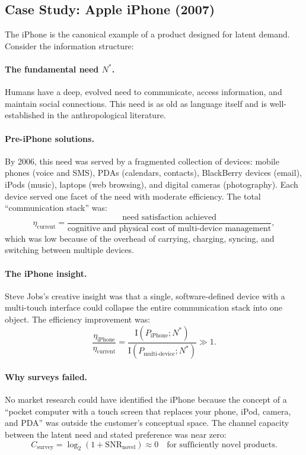 \documentclass[12pt,a4paper,oneside]{book}
\theoremstyle{definition}
\theoremstyle{remark}
\newcommand{\MI}{\mathrm{I}}
\begin{document}
\subsection{Case Study: Apple iPhone (2007)}

The iPhone is the canonical example of a product designed for latent demand. Consider
the information structure:

\paragraph{The fundamental need $N^*$.} Humans have a deep, evolved need to communicate,
access information, and maintain social connections. This need is as old as language
itself and is well-established in the anthropological literature.

\paragraph{Pre-iPhone solutions.} By 2006, this need was served by a fragmented
collection of devices: mobile phones (voice and SMS), PDAs (calendars, contacts),
BlackBerry devices (email), iPods (music), laptops (web browsing), and digital cameras
(photography). Each device served one facet of the need with moderate efficiency. The
total ``communication stack'' was:
\begin{equation}
  \eta_{\text{current}} = \frac{\text{need satisfaction achieved}}
    {\text{cognitive and physical cost of multi-device management}},
\end{equation}
which was low because of the overhead of carrying, charging, syncing, and switching
between multiple devices.

\paragraph{The iPhone insight.} Steve Jobs's creative insight was that a single,
software-defined device with a multi-touch interface could collapse the entire
communication stack into one object. The efficiency improvement was:
\begin{equation}
  \frac{\eta_{\text{iPhone}}}{\eta_{\text{current}}}
  = \frac{\MI(P_{\text{iPhone}}; N^*)}{\MI(P_{\text{multi-device}}; N^*)} \gg 1.
\end{equation}

\paragraph{Why surveys failed.} No market research could have identified the iPhone
because the concept of a ``pocket computer with a touch screen that replaces your phone,
iPod, camera, and PDA'' was outside the customer's conceptual space. The channel capacity
between the latent need and stated preference was near zero:
\begin{equation}
  C_{\text{survey}} = \log_2(1 + \text{SNR}_{\text{novel}}) \approx 0
  \quad \text{for sufficiently novel products}.
\end{equation}
\end{document}

